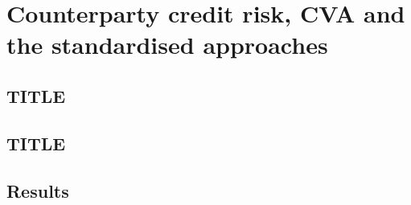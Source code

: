 \chapter{Counterparty credit risk, CVA and the standardised approaches}
\label{ch:ccr}


\section{TITLE}
\label{sec:m20}


\section{TITLE}
\label{sec:m21}


\section{Results}
\label{sec:results-ccr}

